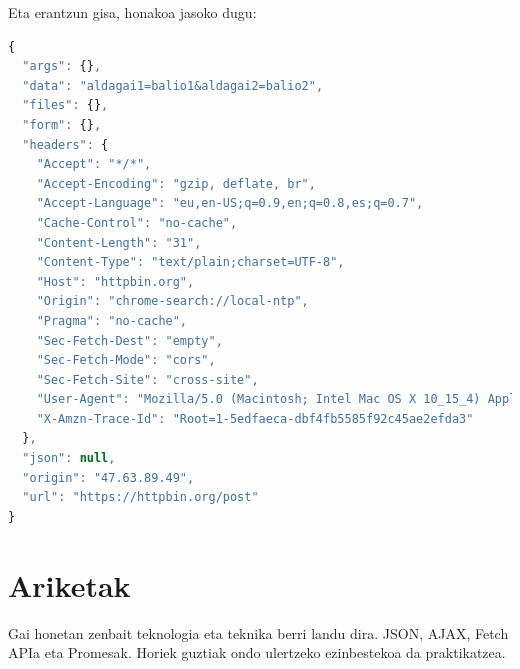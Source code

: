 Eta erantzun gisa, honakoa jasoko dugu:

\begin{lstlisting}[language=JavaScript,numbers=none]
{
  "args": {}, 
  "data": "aldagai1=balio1&aldagai2=balio2", 
  "files": {}, 
  "form": {}, 
  "headers": {
    "Accept": "*/*", 
    "Accept-Encoding": "gzip, deflate, br", 
    "Accept-Language": "eu,en-US;q=0.9,en;q=0.8,es;q=0.7",
    "Cache-Control": "no-cache", 
    "Content-Length": "31", 
    "Content-Type": "text/plain;charset=UTF-8", 
    "Host": "httpbin.org", 
    "Origin": "chrome-search://local-ntp", 
    "Pragma": "no-cache", 
    "Sec-Fetch-Dest": "empty", 
    "Sec-Fetch-Mode": "cors", 
    "Sec-Fetch-Site": "cross-site", 
    "User-Agent": "Mozilla/5.0 (Macintosh; Intel Mac OS X 10_15_4) AppleWebKit/537.36 (KHTML, like Gecko) Chrome/83.0.4103.97 Safari/537.36", 
    "X-Amzn-Trace-Id": "Root=1-5edfaeca-dbf4fb5585f92c45ae2efda3"
  }, 
  "json": null, 
  "origin": "47.63.89.49", 
  "url": "https://httpbin.org/post"
}
\end{lstlisting}

\section{Ariketak}

Gai honetan zenbait teknologia eta teknika berri landu dira. JSON, AJAX, Fetch APIa eta Promesak. Horiek guztiak ondo ulertzeko ezinbestekoa da praktikatzea. 

